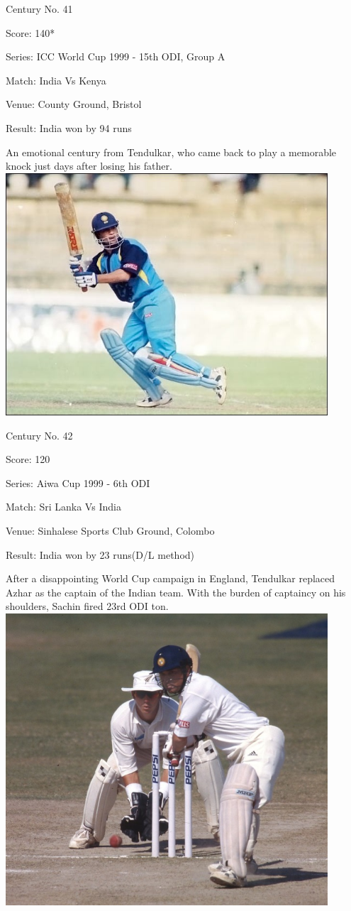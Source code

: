 \documentclass[11pt, a4paper]{article}
\begin{document}
Century No. 41

Score: 140*

Series: ICC World Cup 1999 - 15th ODI, Group A

Match: India Vs Kenya

Venue: County Ground, Bristol

Result: India won by 94 runs

An emotional century from Tendulkar, who came back to play a memorable knock just days after losing his father.
\newpage
\includegraphics[width=0.9\textwidth]{pics/42.jpg}

Century No. 42

Score: 120

Series: Aiwa Cup 1999 - 6th ODI

Match: Sri Lanka Vs India

Venue: Sinhalese Sports Club Ground, Colombo

Result: India won by 23 runs(D/L method)

After a disappointing World Cup campaign in England, Tendulkar replaced Azhar as the captain of the Indian team. With the burden of captaincy on his shoulders, Sachin fired 23rd ODI ton.
\newpage
\includegraphics[width=0.9\textwidth]{pics/43.jpg}
\end{document}
